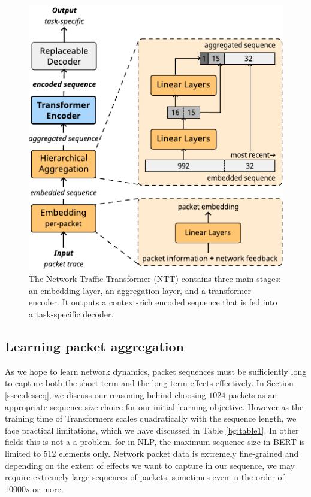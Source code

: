 \begin{figure}[!hbt]
  \begin{center}
    \includegraphics[scale=1.5]{figures/architecture_ntt.pdf}
    \caption{The Network Traffic Transformer (NTT) contains three main stages:  %
        an embedding layer, %
        an aggregation layer, and
        a transformer encoder.
        It outputs a context-rich encoded sequence that is fed into a task-specific decoder.}
    \label{fig:ntt}
  \end{center}
\end{figure}



\subsection{Learning packet aggregation}
\label{ssec:desagg}


As we hope to learn network dynamics, packet sequences must be sufficiently long to capture both the short-term and the long term effects effectively. In Section \ref{ssec:desseq}, we discuss our reasoning behind choosing  $1024$ packets as an appropriate sequence size choice for our initial learning objective. However as the training time of Transformers scales quadratically with the sequence length, we face practical limitations, which we have discussed in Table \ref{bg:table1}. In other fields this is not a a problem, for \eg in NLP, the maximum sequence size in BERT is limited to 512 elements only\cite{devlinBERTPretrainingDeep2019}. Network packet data is extremely fine-grained and depending on the extent of effects we want to capture in our sequence, we may require extremely large sequences of packets, sometimes even in the order of $10000s$ or more.

